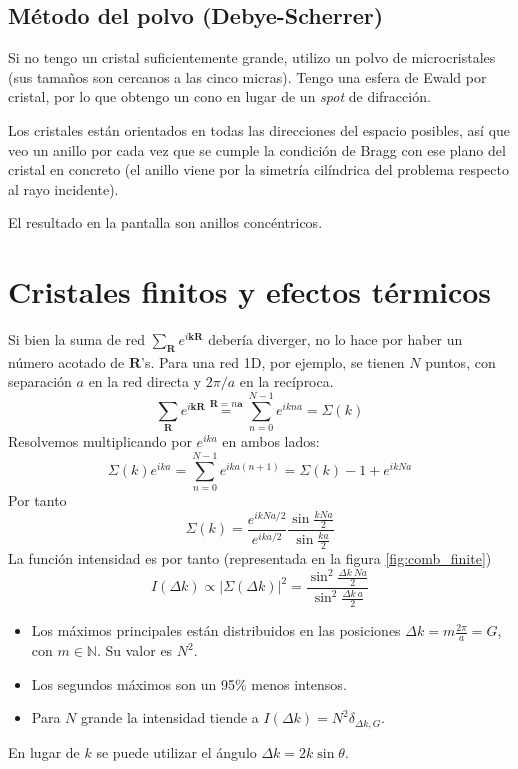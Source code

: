 \subsection{Método del polvo (Debye-Scherrer)}
Si no tengo un cristal suficientemente grande, utilizo un polvo de
microcristales (sus tamaños son cercanos a las cinco micras). Tengo una esfera
de Ewald por cristal, por lo que obtengo un cono en lugar de un \emph{spot} de
difracción.

Los cristales están orientados en todas las direcciones del espacio posibles,
así que veo un anillo por cada vez que se cumple la condición de Bragg con ese
plano del cristal en concreto (el anillo viene por la simetría cilíndrica del
problema respecto al rayo incidente). 

El resultado en la pantalla son anillos concéntricos.

\section{Cristales finitos y efectos térmicos}
Si bien la suma de red $\sum_\mathbf{R}e ^{i\mathbf{k}\mathbf{R}}$ debería
diverger, no lo hace por haber un número acotado de $\mathbf{R}$'s.
Para una red 1D, por ejemplo, se tienen $N$ puntos, con separación $a$ en la red
directa y $2\pi/a$ en la recíproca.
\begin{equation}
  \sum_\mathbf{R} e ^{i\mathbf{k}\mathbf{R}} \stackrel{\mathbf{R}=n\mathbf{a}}{=} \sum_{n=0}^{N-1} e ^{ikna} = \Sigma(k)
\end{equation}
Resolvemos multiplicando por $e ^{ika}$ en ambos lados:
\begin{equation}
  \Sigma(k) e ^{ika} = \sum_{n=0}^{N-1} e ^{ika(n+1)} = \Sigma(k)-1+e ^{ikNa}  
\end{equation}
Por tanto
\begin{equation}
    \Sigma(k)=\frac{e ^{ikNa/2}}{e ^{ika/2}} \frac{\sin \frac{kNa}{2}}{\sin \frac{ka}{2}}
\end{equation}
La función intensidad es por tanto (representada en la figura
\ref{fig:comb_finite})
\begin{equation}
  I(\Delta k) \propto \vert \Sigma(\Delta k)\vert^2 = \frac{\sin^2\frac{\Delta k\ Na}{2}}{\sin^2\frac{\Delta k\ a}{2}}
\end{equation}

\begin{itemize}
\item Los máximos principales están distribuidos en las posiciones $\Delta k = m
  \frac{2\pi}{a} = G$, con $m\in \mathbb{N}$. Su valor es $N^2$.
\item Los segundos máximos son un 95\% menos intensos.
\item Para $N$ grande la intensidad tiende a $I(\Delta k) = N^2 \delta_{\Delta k,G}$.
\end{itemize}
En lugar de $k$ se puede utilizar el ángulo $\Delta k = 2k\sin \theta$.

